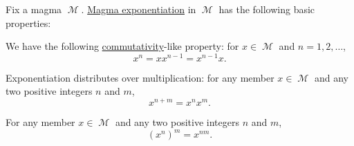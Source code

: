 \begin{proposition}\label{thm:magma_exponentiation_properties}
  Fix a magma \( \mscrM \). \hyperref[def:magma/exponentiation]{Magma exponentiation} in \( \mscrM \) has the following basic properties:

  \begin{PropEnum}
     We have the following \hyperref[def:magma/commutative]{commutativity}-like property: for \( x \in \mscrM \) and \( n = 1, 2, \ldots \),
    \begin{equation}\label{eq:thm:magma_exponentiation_properties/commutativity}
      x^n = x x^{n-1} = x^{n-1} x.
    \end{equation}

     Exponentiation distributes over multiplication: for any member \( x \in \mscrM \) and any two positive integers \( n \) and \( m \),
    \begin{equation}\label{eq:thm:magma_exponentiation_properties/multiplication}
      x^{n + m} = x^n x^m.
    \end{equation}

     For any member \( x \in \mscrM \) and any two positive integers \( n \) and \( m \),
    \begin{equation}\label{eq:thm:magma_exponentiation_properties/repeated}
      (x^n)^m = x^{nm}.
    \end{equation}
  \end{PropEnum}
\end{proposition}
